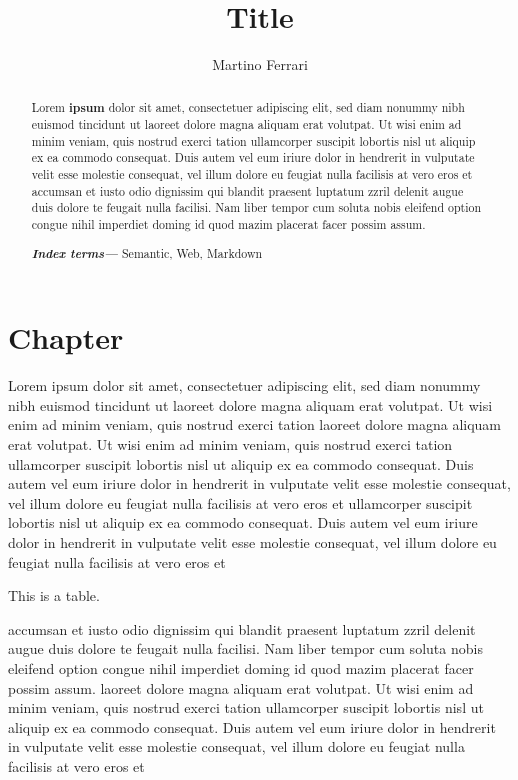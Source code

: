 \documentclass[a4paper,10pt]{article}
\author{Martino Ferrari}
\providecommand{\keywords}[1]{\textbf{\textit{Index terms---}} #1}\title{Title}
\begin{document}
\maketitle
\begin{abstract}

Lorem \textbf{ipsum}
dolor sit amet, consectetuer adipiscing elit, sed diam nonummy nibh euismod tincidunt ut
laoreet dolore magna aliquam erat volutpat. Ut wisi enim ad minim veniam, quis nostrud exerci tation
ullamcorper suscipit lobortis nisl ut aliquip ex ea commodo consequat. Duis autem vel eum iriure dolor in hendrerit in
vulputate velit esse molestie consequat, vel illum dolore eu feugiat nulla facilisis at vero eros et
accumsan et iusto odio dignissim qui blandit praesent luptatum zzril delenit augue duis dolore te feugait nulla facilisi.
Nam liber tempor cum soluta nobis eleifend option congue nihil imperdiet doming id quod mazim placerat facer possim assum.

\keywords{Semantic, Web, Markdown}
\end{abstract}

\tableofcontents
\section{Chapter}

Lorem ipsum
dolor sit amet, consectetuer adipiscing elit, sed diam nonummy nibh euismod tincidunt ut
laoreet dolore magna aliquam erat volutpat. Ut wisi enim ad minim veniam, quis nostrud exerci tation
laoreet dolore magna aliquam erat volutpat. Ut wisi enim ad minim veniam, quis nostrud exerci tation
ullamcorper suscipit lobortis nisl ut aliquip ex ea commodo consequat. Duis autem vel eum iriure dolor in hendrerit in
vulputate velit esse molestie consequat, vel illum dolore eu feugiat nulla facilisis at vero eros et
ullamcorper suscipit lobortis nisl ut aliquip ex ea commodo consequat. Duis autem vel eum iriure dolor in hendrerit in
vulputate velit esse molestie consequat, vel illum dolore eu feugiat nulla facilisis at vero eros et

\begin{table}

\caption{This is a table.}
\label{tab:simple}
\end{table}

accumsan et iusto odio dignissim qui blandit praesent luptatum zzril delenit augue duis dolore te feugait nulla facilisi.
Nam liber tempor cum soluta nobis eleifend option congue nihil imperdiet doming id quod mazim placerat facer possim assum.
laoreet dolore magna aliquam erat volutpat. Ut wisi enim ad minim veniam, quis nostrud exerci tation
ullamcorper suscipit lobortis nisl ut aliquip ex ea commodo consequat. Duis autem vel eum iriure dolor in hendrerit in
vulputate velit esse molestie consequat, vel illum dolore eu feugiat nulla facilisis at vero eros et
\end{document}
